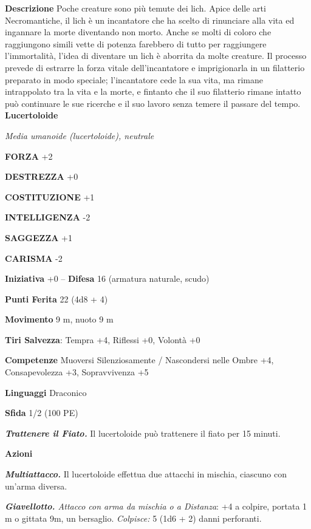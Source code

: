\begin{multicols}{2}
\textbf{Descrizione}
Poche creature sono più temute dei lich. Apice delle arti Necromantiche, il lich è un incantatore che ha scelto di rinunciare alla vita ed ingannare la morte diventando non morto. Anche se molti di coloro che raggiungono simili vette di potenza farebbero di tutto per raggiungere l'immortalità, l'idea di diventare un lich è aborrita da molte creature. Il processo prevede di estrarre la forza vitale dell'incantatore e imprigionarla in un filatterio preparato in modo speciale; l'incantatore cede la sua vita, ma rimane intrappolato tra la vita e la morte, e fintanto che il suo filatterio rimane intatto può continuare le sue ricerche e il suo lavoro senza temere il passare del tempo.\\



\medskip{}\textbf{Lucertoloide}

\emph{Media umanoide (lucertoloide), neutrale}

\textbf{FORZA} +2

\textbf{DESTREZZA} +0

\textbf{COSTITUZIONE} +1

\textbf{INTELLIGENZA} -2

\textbf{SAGGEZZA} +1

\textbf{CARISMA} -2

\textbf{Iniziativa} +0 -- \textbf{Difesa} 16 (armatura naturale, scudo)

\textbf{Punti Ferita} 22 (4d8 + 4)

\textbf{Movimento} 9 m, nuoto 9 m

\textbf{Tiri Salvezza}: Tempra +4, Riflessi +0, Volontà +0

\textbf{Competenze} Muoversi Silenziosamente / Nascondersi nelle Ombre +4, Consapevolezza +3, Sopravvivenza +5

\textbf{Linguaggi} Draconico

\textbf{Sfida} 1/2 (100 PE)

\emph{\textbf{Trattenere il Fiato.}} Il lucertoloide può trattenere il fiato per 15 minuti.

\textbf{Azioni}

\emph{\textbf{Multiattacco.}} Il lucertoloide effettua due attacchi in mischia, ciascuno con un'arma diversa.

\emph{\textbf{Giavellotto.} Attacco con arma da mischia o a Distanza}: +4 a colpire, portata 1 m o gittata 9m, un bersaglio. \emph{Colpisce:} 5 (1d6 + 2) danni perforanti.


\end{multicols}
